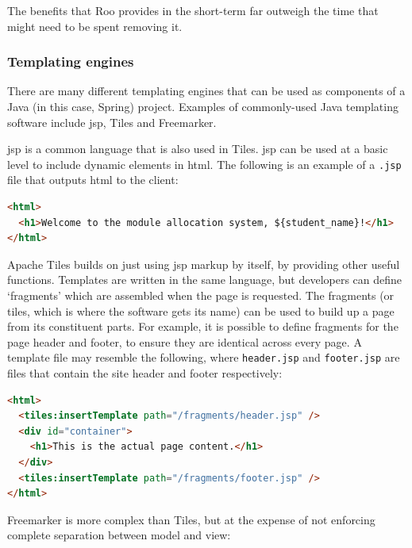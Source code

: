 \documentclass[twoside,draft]{scrartcl}
\begin{document}
The benefits that Roo provides in the short-term far outweigh the time that
might need to be spent removing it.

\subsubsection{Templating engines}


There are many different templating engines that can be used as components of
a Java (in this case, Spring) project. Examples of commonly-used Java
templating software include \gls{jsp}, Tiles and Freemarker.


\gls{jsp} is a common language that is also used in Tiles. \gls{jsp} can be
used at a basic level to include dynamic elements in \gls{html}. The following
is an example of a \texttt{.jsp} file that outputs \gls{html} to the client:

\begin{lstlisting}[language=HTML]
<html>
  <h1>Welcome to the module allocation system, ${student_name}!</h1>
</html>
\end{lstlisting}


Apache Tiles builds on just using \gls{jsp} markup by itself, by providing
other useful functions. Templates are written in the same language, but
developers can define `fragments' which are assembled when the page is
requested. The fragments (or tiles, which is where the software gets its name)
can be used to build up a page from its constituent parts. For example, it is
possible to define fragments for the page header and footer, to ensure they
are identical across every page. A template file may resemble the following,
where \texttt{header.jsp} and \texttt{footer.jsp} are files that contain the
site header and footer respectively:

\begin{lstlisting}[language=HTML]
<html>
  <tiles:insertTemplate path="/fragments/header.jsp" />
  <div id="container">
    <h1>This is the actual page content.</h1>
  </div>
  <tiles:insertTemplate path="/fragments/footer.jsp" />
</html>
\end{lstlisting}


Freemarker is more complex than Tiles, but at the expense of not enforcing
complete separation between model and view:
\end{document}
